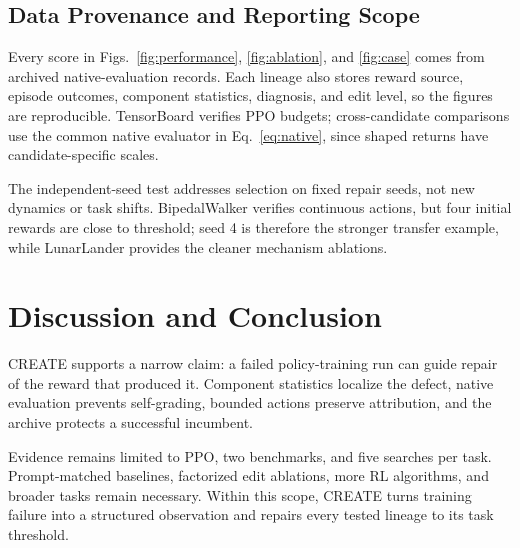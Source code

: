 \documentclass[conference]{IEEEtran}
\begin{document}
\subsection{Data Provenance and Reporting Scope}
Every score in Figs.~\ref{fig:performance}, \ref{fig:ablation}, and
\ref{fig:case} comes from archived native-evaluation records. Each lineage also
stores reward source, episode outcomes, component statistics, diagnosis, and
edit level, so the figures are reproducible. TensorBoard verifies PPO budgets;
cross-candidate comparisons use the common native evaluator in
Eq.~\eqref{eq:native}, since shaped returns have candidate-specific scales.

The independent-seed test addresses selection on fixed repair seeds, not new
dynamics or task shifts. BipedalWalker verifies continuous actions, but four
initial rewards are close to threshold; seed 4 is therefore the stronger
transfer example, while LunarLander provides the cleaner mechanism ablations.

\section{Discussion and Conclusion}
CREATE supports a narrow claim: a failed policy-training run can guide repair
of the reward that produced it. Component statistics localize the defect,
native evaluation prevents self-grading, bounded actions preserve attribution,
and the archive protects a successful incumbent.

Evidence remains limited to PPO, two benchmarks, and five searches per task.
Prompt-matched baselines, factorized edit ablations, more RL algorithms, and
broader tasks remain necessary. Within this scope, CREATE turns training
failure into a structured observation and repairs every tested lineage to its
task threshold.
\end{document}
